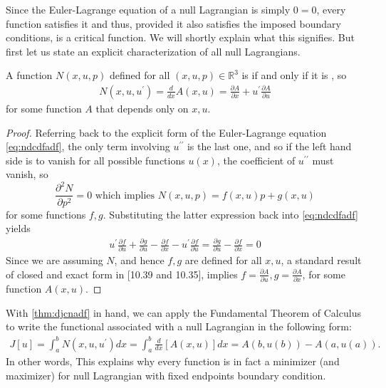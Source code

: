 \documentclass{article}
\begin{document}
Since the Euler-Lagrange equation of a null Lagrangian is simply $0=0$, every function satisfies it and thus, provided it also satisfies the imposed boundary conditions, is a critical function. We will shortly explain what this signifies. But first let us state an explicit characterization of all null Lagrangians.
\begin{thma}\label{thm:djcnadf}
A function $N(x, u, p)$ defined for all $(x, u, p) \in \mathbb{R}^{3}$ is  if and only if it is , so
\begin{align*}
N\left(x, u, u^{\prime}\right)=\frac{d}{d x} A(x, u)=\frac{\partial A}{\partial x}+u^{\prime} \frac{\partial A}{\partial u}
\end{align*}
for some function $A$ that depends only on $x, u$.
\end{thma} 
\begin{proof}
Referring back to the explicit form of the Euler-Lagrange equation \cref{eq:ndcdfadf}, the only term involving $u^{\prime \prime}$ is the last one, and so if the left hand side is to vanish for all possible functions $u(x)$, the coefficient of $u^{\prime \prime}$ must vanish, so 
$$\frac{\partial^{2} N}{\partial p^{2}}=0\text{ which implies }N(x, u, p)=f(x, u) p+g(x, u)$$
for some functions $f, g$. Substituting the latter expression back into \cref{eq:ndcdfadf} yields
\begin{align*}
u^{\prime} \frac{\partial f}{\partial u}+\frac{\partial g}{\partial u}-\frac{\partial f}{\partial x}-u^{\prime} \frac{\partial f}{\partial u}=\frac{\partial g}{\partial u}-\frac{\partial f}{\partial x}=0
\end{align*}
Since we are assuming $N$, and hence $f, g$ are defined for all $x, u$, a standard result of closed and exact form in \cite{rudin1976principles}[10.39 and 10.35], implies $f=\frac{\partial A}{\partial u}, g=\frac{\partial A}{\partial x}$, for some function $A(x, u)$.
\end{proof}
\begin{rema}
With \cref{thm:djcnadf} in hand, we can apply the Fundamental Theorem of Calculus to write the functional associated with a null Lagrangian in the following form:
\begin{align*}
J[u]=\int_{a}^{b} N\left(x, u, u^{\prime}\right) d x=\int_{a}^{b} \frac{d}{d x}[A(x, u)] d x=A(b, u(b))-A(a, u(a)) .
\end{align*}
In other words,  This explains why every function is in fact a minimizer (and maximizer) for null Lagrangian with fixed endpoints boundary condition.
\end{rema}
\end{document}
